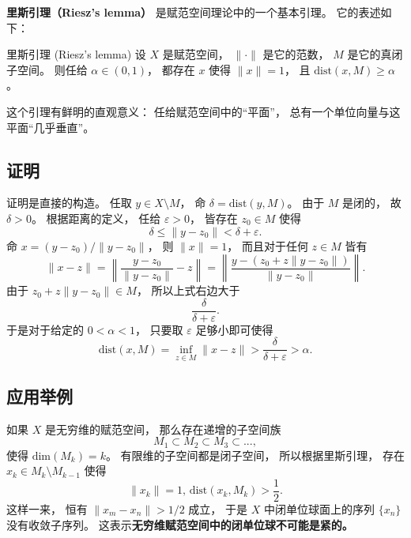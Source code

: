 
\begin{issues}
\issueNeedCite
\end{issues}


\textbf{里斯引理（Riesz's lemma）} 是赋范空间理论中的一个基本引理。 它的表述如下：

\begin{lemma}{里斯引理 (Riesz's lemma)}
设 $X$ 是赋范空间， $\|\cdot\|$ 是它的范数， $M$ 是它的真闭子空间。 则任给 $\alpha\in(0,1)$， 都存在 $x$ 使得 $\|x\|=1$， 且 $\text{dist}(x,M)\geq\alpha$。
\end{lemma}

这个引理有鲜明的直观意义： 任给赋范空间中的“平面”， 总有一个单位向量与这平面“几乎垂直”。

\subsection{证明}
证明是直接的构造。 任取 $y\in X\setminus M$， 命 $\delta=\text{dist}(y,M)$。 由于 $M$ 是闭的， 故 $\delta>0$。 根据距离的定义， 任给 $\varepsilon>0$， 皆存在 $z_0\in M$ 使得
$$
\delta\leq \|y-z_0\|<\delta+\varepsilon.
$$
命 $x=(y-z_0)/\|y-z_0\|$， 则 $\|x\|=1$， 而且对于任何 $z\in M$ 皆有
$$
\|x-z\|
=\left\|\frac{y-z_0}{\|y-z_0\|}-z\right\|
=\left\|\frac{y-(z_0+z\|y-z_0\|)}{\|y-z_0\|}\right\|.
$$
由于 $z_0+z\|y-z_0\|\in M$， 所以上式右边大于
$$
\frac{\delta}{\delta+\varepsilon}.
$$
于是对于给定的 $0<\alpha<1$， 只要取 $\varepsilon$ 足够小即可使得
$$
\text{dist}(x,M)
=\inf_{z\in M}\|x-z\|
>\frac{\delta}{\delta+\varepsilon}
>\alpha.
$$

\subsection{应用举例}
如果 $X$ 是无穷维的赋范空间， 那么存在递增的子空间族
$$
M_1\subset M_2\subset M_3\subset...,
$$
使得 $\text{dim}(M_k)=k$。 有限维的子空间都是闭子空间， 所以根据里斯引理， 存在 $x_k\in M_k\setminus M_{k-1}$ 使得
$$
\|x_k\|=1,\,\text{dist}(x_k,M_k)>\frac{1}{2}.
$$
这样一来， 恒有 $\|x_m-x_n\|>1/2$ 成立， 于是 $X$ 中闭单位球面上的序列 $\{x_n\}$ 没有收敛子序列。 这表示\textbf{无穷维赋范空间中的闭单位球不可能是紧的。}